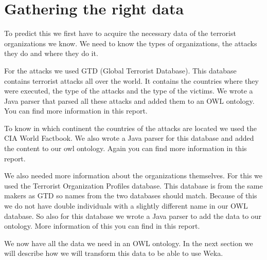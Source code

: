 \documentclass[a4]{article}
\begin{document}
\section{Gathering the right data}
\label{sec:gathering_data}
To predict this we first have to acquire the necessary data of the terrorist organizations we know. We need to know the types of organizations, the attacks they do and where they do it.\par
For the attacks we used GTD (Global Terrorist Database)\cite{gtd}. This database contains terrorist attacks all over the world. It contains the countries where they were executed, the type of the attacks and the type of the victims. We wrote a Java parser that parsed all these attacks and added them to an OWL ontology. You can find more information in this\cite{homework2} report.\par To know in which continent the countries of the attacks are located we used the CIA World Factbook\cite{factbook}. We also wrote a Java parser for this database and added the content to our owl ontology. Again you can find more information in this\cite{homework2} report.\par
We also needed more information about the organizations themselves. For this we used the Terrorist Organization Profiles database\cite{start}. This database is from the same makers as GTD so names from the two databases should match. Because of this we do not have double individuals with a slightly different name in our OWL database. So also for this database we wrote a Java parser to add the data to our ontology. More information of this you can find in this\cite{homework3} report.\par
We now have all the data we need in an OWL ontology. In the next section we will describe how we will transform this data to be able to use Weka.
\end{document}
